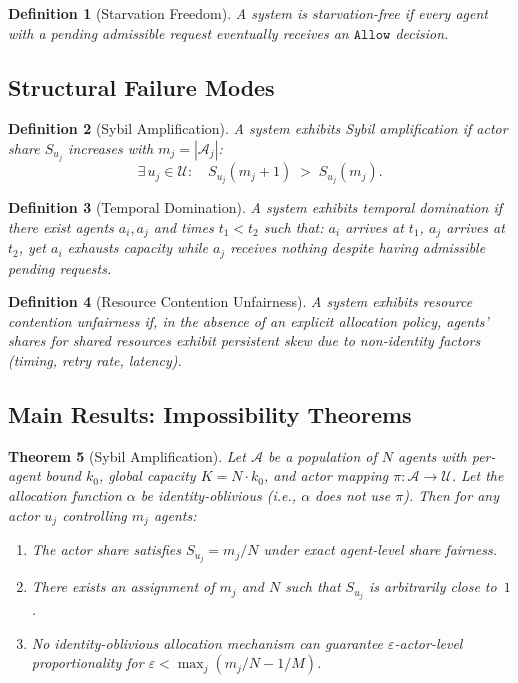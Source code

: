 \documentclass[11pt]{article}
\newtheorem{theorem}{Theorem}[section]
\newtheorem{definition}[theorem]{Definition}
\newcommand{\allow}{\texttt{Allow}}
\newcommand{\Agents}{\mathcal{A}}
\newcommand{\Actors}{\mathcal{U}}
\newcommand{\Share}[1]{S_{#1}}
\newcommand{\kbound}{k_0}
\newcommand{\Kcap}{K}
\begin{document}
\begin{definition}[Starvation Freedom]
\label{def:starvation}
A system is \emph{starvation-free} if every agent with a pending admissible request eventually receives an $\allow$ decision.
\end{definition}

\subsection{Structural Failure Modes}

\begin{definition}[Sybil Amplification]
\label{def:sybil}
A system exhibits \emph{Sybil amplification} if actor share $\Share{u_j}$ increases with $m_j = |\Agents_j|$:
\[
  \exists\, u_j \in \Actors : \quad
  \Share{u_j}(m_j + 1) \;>\; \Share{u_j}(m_j).
\]
\end{definition}

\begin{definition}[Temporal Domination]
\label{def:temporal-dom}
A system exhibits \emph{temporal domination} if there exist agents $a_i, a_j$ and times $t_1 < t_2$ such that: $a_i$ arrives at $t_1$, $a_j$ arrives at $t_2$, yet $a_i$ exhausts capacity while $a_j$ receives nothing despite having admissible pending requests.
\end{definition}

\begin{definition}[Resource Contention Unfairness]
\label{def:contention}
A system exhibits \emph{resource contention unfairness} if, in the absence of an explicit allocation policy, agents' shares for shared resources exhibit persistent skew due to non-identity factors (timing, retry rate, latency).
\end{definition}

\subsection{Main Results: Impossibility Theorems}

\begin{theorem}[Sybil Amplification]
\label{thm:sybil}
Let $\Agents$ be a population of $N$ agents with per-agent bound $\kbound$, global capacity $\Kcap = N \cdot \kbound$, and actor mapping $\pi : \Agents \to \Actors$. Let the allocation function $\alpha$ be identity-oblivious (i.e., $\alpha$ does not use $\pi$). Then for any actor $u_j$ controlling $m_j$ agents:
\begin{enumerate}[label=(\roman*)]
  \item The actor share satisfies $\Share{u_j} = m_j / N$ under exact agent-level share fairness.
  \item There exists an assignment of $m_j$ and $N$ such that $\Share{u_j}$ is arbitrarily close to~$1$.
  \item No identity-oblivious allocation mechanism can guarantee $\varepsilon$-actor-level proportionality for $\varepsilon < \max_j (m_j/N - 1/M)$.
\end{enumerate}
\end{theorem}
\end{document}
